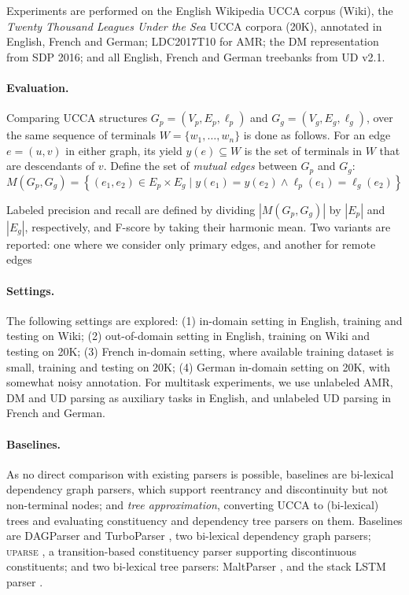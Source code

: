 \documentclass[12pt,a4paper]{report}
\begin{document}
Experiments are performed on the English Wikipedia UCCA corpus (Wiki),
the \textit{Twenty Thousand Leagues Under the Sea} UCCA corpora (20K),
annotated in English, French and German;
LDC2017T10 for AMR;
the DM representation from SDP 2016;
and all English, French and German treebanks from UD v2.1.


\paragraph{Evaluation.}
Comparing UCCA structures
$G_p=(V_p,E_p,\ell_p)$ and $G_g=(V_g,E_g,\ell_g)$,
over the same sequence of terminals $W = \{w_1,\ldots,w_n\}$
is done as follows.
For an edge $e=(u,v)$ in either graph, its yield $y(e) \subseteq W$ is the
set of terminals in $W$ that are descendants of $v$.
Define the set of \textit{mutual edges} between $G_p$ and $G_g$:
\[
    M(G_p,G_g) =
    \left\{(e_1,e_2) \in E_p \times E_g \;|\;
    y(e_1) = y(e_2) \wedge \ell_p(e_1)=\ell_g(e_2)\right\}
\]

Labeled precision and recall are defined by dividing $|M(G_p,G_g)|$ by $|E_p|$ and $|E_g|$, respectively,
and F-score by taking their harmonic mean.
Two variants are reported: one where we consider only primary edges,
and another for remote edges


\paragraph{Settings.}

The following settings are explored:
(1) in-domain setting in English, training and testing on Wiki;
(2) out-of-domain setting in English, training on Wiki and testing on 20K;
(3) French in-domain setting, where available training dataset is small,
training and testing on 20K;
(4) German in-domain setting on 20K, with somewhat noisy annotation.
For multitask experiments, we use unlabeled AMR, DM and UD parsing as auxiliary tasks in English,
and unlabeled UD parsing in French and German.

\paragraph{Baselines.}
As no direct comparison with existing parsers is possible,
baselines are bi-lexical dependency graph parsers,
which support reentrancy and discontinuity but not non-terminal nodes;
and \textit{tree approximation}, converting UCCA to (bi-lexical) trees
and evaluating constituency and dependency tree parsers on them.
Baselines are DAGParser \citep{ribeyre-villemontedelaclergerie-seddah:2014:SemEval} and
TurboParser \citep{almeida-martins:2015:SemEval},
two bi-lexical dependency graph parsers;
\textsc{uparse} \citep{maier-lichte:2016:DiscoNLP},
a transition-based constituency parser supporting discontinuous constituents;
and two bi-lexical tree parsers:
MaltParser \citep{nivre2007maltparser},
and the stack LSTM parser \citep{dyer2015transition}.
\end{document}
